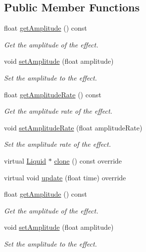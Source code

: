 \subsection*{Public Member Functions}
\begin{DoxyCompactItemize}
\item 
float \hyperlink{classLiquid_aaa57e3822c4898e355f1a1fd8f149251}{get\+Amplitude} () const
\begin{DoxyCompactList}\small\item\em Get the amplitude of the effect. \end{DoxyCompactList}\item 
void \hyperlink{classLiquid_a9290cc78546a4789c799f0c3a207fe24}{set\+Amplitude} (float amplitude)
\begin{DoxyCompactList}\small\item\em Set the amplitude to the effect. \end{DoxyCompactList}\item 
float \hyperlink{classLiquid_ad2061dd34f3cf9f30a416f15c9bcbad1}{get\+Amplitude\+Rate} () const
\begin{DoxyCompactList}\small\item\em Get the amplitude rate of the effect. \end{DoxyCompactList}\item 
void \hyperlink{classLiquid_a2472c32e0f54760e8bfb9c2b21424220}{set\+Amplitude\+Rate} (float amplitude\+Rate)
\begin{DoxyCompactList}\small\item\em Set the amplitude rate of the effect. \end{DoxyCompactList}\item 
virtual \hyperlink{classLiquid}{Liquid} $\ast$ \hyperlink{classLiquid_ae1ca20f6c336cad86c748c547d1b4420}{clone} () const override
\item 
virtual void \hyperlink{classLiquid_af8fb9abd724ae6ea4ff9db4b07421c61}{update} (float time) override
\item 
float \hyperlink{classLiquid_aaa57e3822c4898e355f1a1fd8f149251}{get\+Amplitude} () const
\begin{DoxyCompactList}\small\item\em Get the amplitude of the effect. \end{DoxyCompactList}\item 
void \hyperlink{classLiquid_a9290cc78546a4789c799f0c3a207fe24}{set\+Amplitude} (float amplitude)
\begin{DoxyCompactList}\small\item\em Set the amplitude to the effect. \end{DoxyCompactList}\item 

\end{DoxyCompactItemize}

